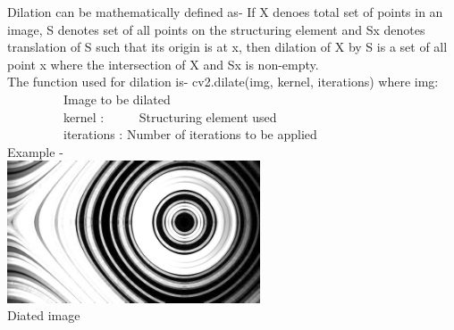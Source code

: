 \documentclass{article}
\begin{document}
\begin{flushleft}
	Dilation can be mathematically defined as- If X denoes total set of points in an image, S denotes set of all points on the structuring element and Sx denotes translation of S such that its origin is at x, then dilation of X by S is a set of all point x where the intersection of X and Sx is non-empty. \\
	The function used for dilation is- cv2.dilate(img, kernel, iterations)  where img: \ \ \ \ \ \ \ \ \   Image to be dilated\\
	\ \ \ \ \ \ \ \ \        kernel : \ \ \ \ \ Structuring element used  \\
	\ \ \ \ \ \ \ \ \      iterations : Number of iterations to be applied \\
	Example - \\
		\includegraphics[width = 75mm]{Dilated.jpg} \\
		\small Diated image \\
		
	
	
\end{flushleft}
		
\end{document}
